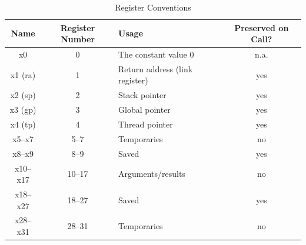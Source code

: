 \begin{table}[h]
    \centering
    \caption{Register Conventions}
    \begin{tabular}{|c|c|l|c|}
        \hline
        \textbf{Name} & \textbf{Register Number} & \textbf{Usage}                 & \textbf{Preserved on Call?} \\
        \hline
        x0            & 0                        & The constant value 0           & n.a.                        \\
        x1 (ra)       & 1                        & Return address (link register) & yes                         \\
        x2 (sp)       & 2                        & Stack pointer                  & yes                         \\
        x3 (gp)       & 3                        & Global pointer                 & yes                         \\
        x4 (tp)       & 4                        & Thread pointer                 & yes                         \\
        x5–x7         & 5–7                      & Temporaries                    & no                          \\
        x8–x9         & 8–9                      & Saved                          & yes                         \\
        x10–x17       & 10–17                    & Arguments/results              & no                          \\
        x18–x27       & 18–27                    & Saved                          & yes                         \\
        x28–x31       & 28–31                    & Temporaries                    & no                          \\
        \hline
    \end{tabular}
\end{table}

